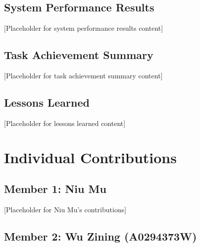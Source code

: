 \documentclass[12pt,a4paper]{article}
\begin{document}

\subsection{System Performance Results}


[Placeholder for system performance results content]

\subsection{Task Achievement Summary}


[Placeholder for task achievement summary content]

\subsection{Lessons Learned}


[Placeholder for lessons learned content]

\section{Individual Contributions}


\subsection{Member 1: Niu Mu}


[Placeholder for Niu Mu's contributions]

\subsection{Member 2: Wu Zining (A0294373W)}
\end{document}
